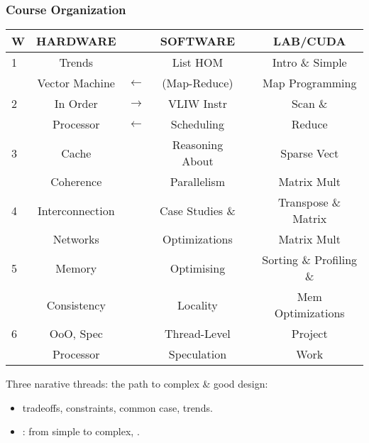 \begin{frame}
\frametitle{Course Organization}

\begin{tabular}{lccccc}
W  & HARDWARE  & & SOFTWARE     & & LAB/CUDA \\\hline\hline
1 & Trends         &                         & List HOM     & & Intro \& Simple\\
  & Vector Machine & $\longleftarrow$ & (Map-Reduce) & & Map Programming\\\hline
%
2 & In Order & $\longrightarrow$ & VLIW Instr   & & Scan \&\\
  & Processor& $\longleftarrow$ &  Scheduling   & & Reduce \\\hline
%
3 & Cache     & & Reasoning About     & & Sparse Vect\\
  & Coherence & & Parallelism   & & Matrix Mult\\\hline
%
4 & Interconnection & & Case Studies \&   & & Transpose \& Matrix\\
  & Networks        & & Optimizations   & & Matrix Mult\\\hline
%
5 & \alert{Memory}      & & Optimising   & & Sorting \& Profiling \& \\
  & \alert{Consistency} & & Locality     & & Mem Optimizations \\\hline
%
6 & OoO, Spec   & & Thread-Level   & & Project \\
  & Processor   & & Speculation    & & Work    \\\hline

\end{tabular}
\medskip

Three narative threads: the path to complex \& good design: 
\begin{itemize}
    \item {} tradeoffs, constraints, common case, trends.
    \item {}: from simple to complex, .
\end  {itemize}
\end{frame}

